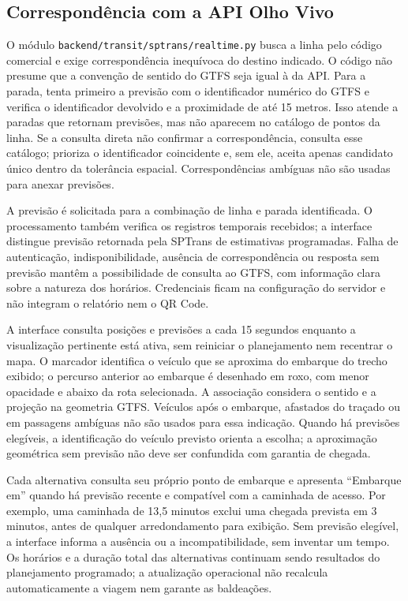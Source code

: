\documentclass[12pt,oneside,a4paper,brazil,chapter=TITLE]{abntex2}
\let\papsection\section
\renewcommand{\section}{\clearpage\papsection}
\begin{document}
\begin{apendicesenv}
\section{Correspondência com a API Olho Vivo}
O módulo \nolinkurl{backend/transit/sptrans/realtime.py} busca a linha pelo código comercial e exige correspondência inequívoca do destino indicado. O código não presume que a convenção de sentido do GTFS seja igual à da API. Para a parada, tenta primeiro a previsão com o identificador numérico do GTFS e verifica o identificador devolvido e a proximidade de até 15 metros. Isso atende a paradas que retornam previsões, mas não aparecem no catálogo de pontos da linha. Se a consulta direta não confirmar a correspondência, consulta esse catálogo; prioriza o identificador coincidente e, sem ele, aceita apenas candidato único dentro da tolerância espacial. Correspondências ambíguas não são usadas para anexar previsões.

A previsão é solicitada para a combinação de linha e parada identificada. O processamento também verifica os registros temporais recebidos; a interface distingue previsão retornada pela SPTrans de estimativas programadas. Falha de autenticação, indisponibilidade, ausência de correspondência ou resposta sem previsão mantêm a possibilidade de consulta ao GTFS, com informação clara sobre a natureza dos horários. Credenciais ficam na configuração do servidor e não integram o relatório nem o QR Code.

A interface consulta posições e previsões a cada 15 segundos enquanto a visualização pertinente está ativa, sem reiniciar o planejamento nem recentrar o mapa. O marcador identifica o veículo que se aproxima do embarque do trecho exibido; o percurso anterior ao embarque é desenhado em roxo, com menor opacidade e abaixo da rota selecionada. A associação considera o sentido e a projeção na geometria GTFS. Veículos após o embarque, afastados do traçado ou em passagens ambíguas não são usados para essa indicação. Quando há previsões elegíveis, a identificação do veículo previsto orienta a escolha; a aproximação geométrica sem previsão não deve ser confundida com garantia de chegada.

Cada alternativa consulta seu próprio ponto de embarque e apresenta ``Embarque em'' quando há previsão recente e compatível com a caminhada de acesso. Por exemplo, uma caminhada de 13,5 minutos exclui uma chegada prevista em 3 minutos, antes de qualquer arredondamento para exibição. Sem previsão elegível, a interface informa a ausência ou a incompatibilidade, sem inventar um tempo. Os horários e a duração total das alternativas continuam sendo resultados do planejamento programado; a atualização operacional não recalcula automaticamente a viagem nem garante as baldeações.


\end{apendicesenv}
\end{document}

